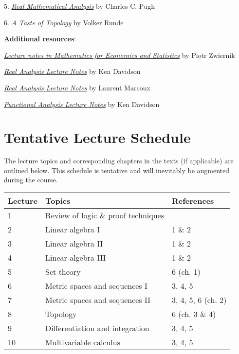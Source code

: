 \documentclass[12pt]{article}
\begin{document}
5. \href{https://link-springer-com.myaccess.library.utoronto.ca/book/10.1007/978-3-319-17771-7}{\emph{Real Mathematical Analysis}} by Charles C. Pugh

6. \href{https://link-springer-com.myaccess.library.utoronto.ca/book/10.1007/0-387-28387-0}{\emph{A Taste of Topology}} by Volker Runde


\vspace{0.4cm}

\noindent
{\bf{Additional resources}}:
\vspace{0.1cm}

\href{http://84.89.132.1/~piotr/docs/RealAnalysisNotes.pdf}{\emph{Lecture notes in Mathematics for Economics and Statistics}} by Piotr Zwiernik

\href{http://www.math.uwaterloo.ca/~krdavids/PM351/PMath351Notes.pdf}{{\emph{Real Analysis Lecture Notes}}} by Ken Davidson

\href{http://www.math.uwaterloo.ca/~lwmarcou/notes/pmath351.pdf}{{\emph{Real Analysis Lecture Notes}}} by Laurent Marcoux

\href{http://www.math.uwaterloo.ca/~krdavids/FA/PM453Notes.pdf}{{\emph{Functional Analysis Lecture Notes}}} by Ken Davidson







\newpage
\section{Tentative Lecture Schedule}
The lecture topics and corresponding chapters in the texts (if applicable) are outlined below.  This schedule is tentative and will inevitably be augmented during the course.  


\begin{longtable}{| p{1.5cm}  | p{8cm} | p{3cm} |}
\hline
{\bf{Lecture}}  & {\bf{Topics}} &  {\bf{References}} \\
\hline
1  & Review of logic \& proof techniques &   \\
\hline
2 &  Linear algebra I & 1 \& 2 \\
\hline
3  &  Linear algebra II & 1 \& 2  \\
\hline
4  & Linear algebra III &  1 \& 2 \\
\hline
5  & Set theory & 6 (ch. 1) \\
\hline
6  &  Metric spaces and sequences I &  3, 4, 5\\
\hline
7  & Metric spaces and sequences II & 3, 4, 5, 6 (ch. 2)  \\
\hline
8  & Topology & 6 (ch. 3 \& 4) \\
 \hline
9  &  Differentiation and integration &  3, 4, 5 \\
\hline
10  &   Multivariable calculus & 3, 4, 5\\
\hline
\end{longtable}
\end{document}
